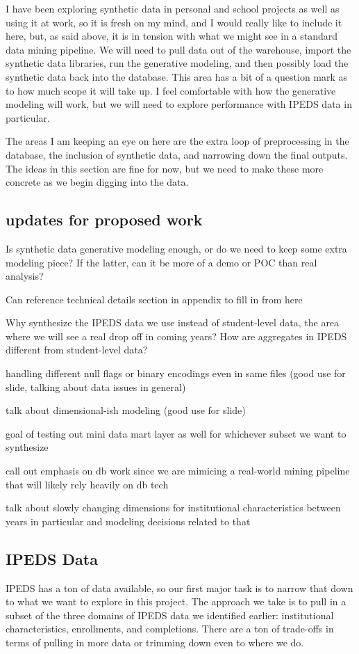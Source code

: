 \documentclass[sigconf, authorversion, nonacm]{acmart}
\begin{document}
    I have been exploring synthetic data in personal and school projects as well as using it at work, so it is fresh on my mind, and I would really like to include it here, but, as said above, it is in tension with what we might see in a standard data mining pipeline. We will need to pull data out of the warehouse, import the synthetic data libraries, run the generative modeling, and then possibly load the synthetic data back into the database. This area has a bit of a question mark as to how much scope it will take up. I feel comfortable with how the generative modeling will work, but we will need to explore performance with IPEDS data in particular.

    The areas I am keeping an eye on here are the extra loop of preprocessing in the database, the inclusion of synthetic data, and narrowing down the final outputs. The ideas in this section are fine for now, but we need to make these more concrete as we begin digging into the data.

    \subsection{updates for proposed work}
        Is synthetic data generative modeling enough, or do we need to keep some extra modeling piece? If the latter, can it be more of a demo or POC than real analysis?

        Can reference technical details section in appendix to fill in from here

        Why synthesize the IPEDS data we use instead of student-level data, the area where we will see a real drop off in coming years? How are aggregates in IPEDS different from student-level data?

        handling different null flags or binary encodings even in same files (good use for slide, talking about data issues in general)

        talk about dimensional-ish modeling (good use for slide)

        goal of testing out mini data mart layer as well for whichever subset we want to synthesize

        call out emphasis on db work since we are mimicing a real-world mining pipeline that will likely rely heavily on db tech

        talk about slowly changing dimensions for institutional characteristics between years in particular and modeling decisions related to that

    \subsection{IPEDS Data}
        IPEDS has a ton of data available, so our first major task is to narrow that down to what we want to explore in this project. The approach we take is to pull in a subset of the three domains of IPEDS data we identified earlier: institutional characteristics, enrollments, and completions. There are a ton of trade-offs in terms of pulling in more data or trimming down even to where we do.
\end{document}

